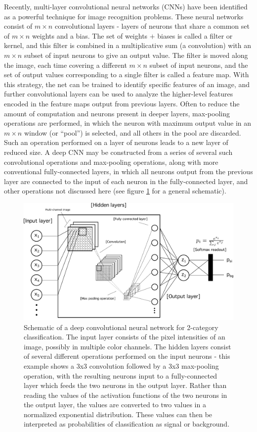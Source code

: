 \documentclass[a4paper,11pt]{article}
\begin{document}
Recently, multi-layer convolutional neural networks (CNNs) have been identified as a powerful technique for image recognition problems.  These neural networks consist of $m\times n$
convolutional layers - layers of neurons that share a common set of $m\times n$ weights and a bias.  The set of 
weights $+$ biases is called a filter or kernel, and this filter is combined in a multiplicative sum (a convolution) with an $m\times n$ subset of input neurons to give an output value.  The filter
is moved along the image, each time covering a different $m\times n$ subset of input neurons, and the set of output values corresponding to a single filter is called a feature map.  With this
strategy, the net can be trained to identify specific features of an image, and further convolutional layers can be used to analyze the higher-level features encoded in the feature maps output
from previous layers.  Often to reduce the amount of computation and neurons present in deeper layers, max-pooling operations are performed, in which the neuron with maximum output
value in an $m\times n$ window (or ``pool'') is selected, and all others in the pool are discarded.  Such an operation performed on a layer of neurons leads to a new layer of reduced size.
A deep CNN may be constructed from a series of several such convolutional operations and max-pooling operations, along with more conventional fully-connected layers, in which all neurons 
output from the previous layer are connected to the input of each neuron in the fully-connected layer, and other operations not discussed here (see figure \ref{fig.generalnn} for a general 
schematic).

\begin{figure}[!htb]
	\centering
	\includegraphics[scale = 0.6]{fig/general_nn.pdf}
	\caption{Schematic of a deep convolutional neural network for 2-category classification.  The input layer consists of the pixel intensities of an image, possibly in multiple color channels.  The 
		hidden layers consist of several different operations performed on the input neurons - this example shows a 3x3 convolution followed by a 3x3 max-pooling operation, with the resulting 
		neurons input to a fully-connected layer which feeds the two neurons in the output layer.  Rather than reading the values of the activation functions of
		the two neurons in the output layer, the values are converted to two values in a normalized exponential distribution.  These values can then be interpreted as probabilities of classification as
		signal or background.} \label{fig.generalnn}
\end{figure}
\end{document}
